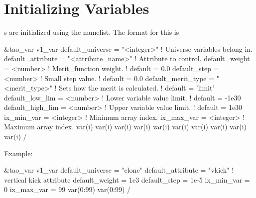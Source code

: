 {{{{{{{{{{{{%
\section{Initializing Variables}
\label{s:init_var} 

s are initialized using the  namelist. The
format for this is
\begin{example}
  &tao_var
    v1_var%
    default_universe   = "<integer>"         ! Universe variables belong in.
    default_attribute  = "<attribute_name>"  ! Attribute to control.
    default_weight     = <number>            ! Merit_function weight.
                                             ! default = 0.0
    default_step       = <number>            ! Small step value.
                                             ! default = 0.0
    default_merit_type = "<merit_type>"      ! Sets how the merit is calculated.
                                             ! default = 'limit'
    default_low_lim    = <number>            ! Lower variable value limit. 
                                             ! default = -1e30
    default_high_lim   = <number>            ! Upper variable value limit. 
                                             ! default =  1e30
    ix_min_var         = <integer>           ! Minimum array index.
    ix_max_var         = <integer>           ! Maximum array index.
    var(i)%
    var(i)%
    var(i)%
    var(i)%
    var(i)%
    var(i)%
    var(i)%
    var(i)%
    var(i)%
    var(i)%
  /
\end{example}
Example:
\begin{example}
  &tao_var
    v1_var%
    default_universe  = "clone"
    default_attribute = "vkick"     ! vertical kick attribute
    default_weight    = 1e3
    default_step      = 1e-5
    ix_min_var        = 0
    ix_max_var        = 99
    var(0:99)%
    var(0:99)%
  /
\end{example}

}}}}}}}}}}}}
